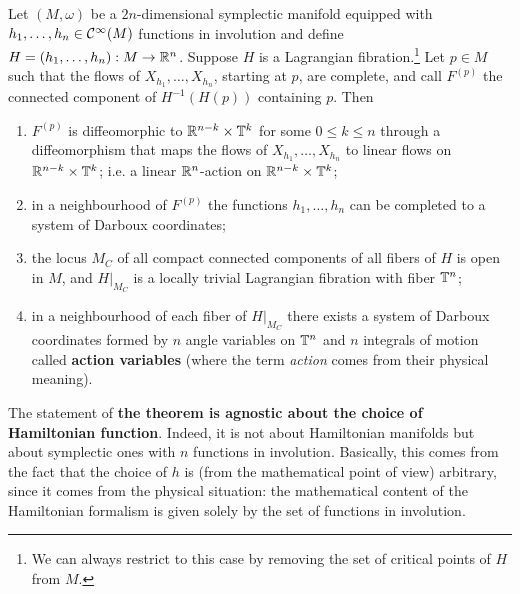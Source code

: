 \documentclass[main.tex]{subfiles}
\begin{document}
\begin{theorem}
\label{th:arnold_liouville}
	Let $(M, \omega)$ be a $2n$-dimensional symplectic manifold equipped with $h_1, \ldots, h_n \in \mathcal{C}^\infty(M)$ functions in involution and define $H = (h_1, \ldots, h_n): M \to \mathbb{R}^n$. Suppose $H$ is a Lagrangian fibration.\footnote{We can always restrict to this case by removing the set of critical points of $H$ from $M$.} Let $p \in M$ such that the flows of $X_{h_1}, \ldots, X_{h_n}$, starting at $p$, are complete\footnotemark, and call $F^{(p)}$ the connected component of $H^{-1}(H(p))$ containing $p$. Then
	\begin{enumerate}
		\item $F^{(p)}$ is diffeomorphic to $\mathbb{R}^{n-k} \times \mathbb{T}^k$ for some $0 \leq k \leq n$ through a diffeomorphism that maps the flows of $X_{h_1}, \ldots, X_{h_n}$ to linear flows on $\mathbb{R}^{n-k} \times \mathbb{T}^k$; i.e. a linear $\mathbb{R}^n$-action on $\mathbb{R}^{n-k} \times \mathbb{T}^k$;
		\item in a neighbourhood of $F^{(p)}$ the functions $h_1, \ldots, h_n$ can be completed to a system of Darboux coordinates;
		\item the locus $M_C$ of all compact connected components of all fibers of $H$ is open in $M$, and $H\vert_{M_C}$ is a locally trivial Lagrangian fibration with fiber $\mathbb{T}^n$;
		\item in a neighbourhood of each fiber of $H\vert_{M_C}$ there exists a system of Darboux coordinates formed by $n$ angle variables on $\mathbb{T}^n$ and $n$ integrals of motion called \textbf{action variables} (where the term \emph{action} comes from their physical meaning).
	\end{enumerate}
\end{theorem}
\begin{remark}
	The statement of \textbf{the theorem is agnostic about the choice of Hamiltonian function}. Indeed, it is not about Hamiltonian manifolds but about symplectic ones with $n$ functions in involution. Basically, this comes from the fact that the choice of $h$ is (from the mathematical point of view) arbitrary, since it comes from the physical situation: the mathematical content of the Hamiltonian formalism is given solely by the set of functions in involution.
\end{remark}
\end{document}
